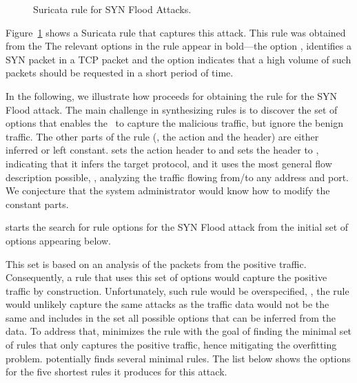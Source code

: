 \documentclass[runningheads]{llncs}
\begin{document}
\begin{figure}[h!]
  
  \caption{Suricata rule for SYN Flood Attacks.}
  \label{fig:synflood-example}
\end{figure}


Figure~\ref{fig:synflood-example} shows a Suricata rule that captures
this attack. This rule was obtained from the 
The relevant options in the rule appear in bold---the option
, identifies a SYN packet in a TCP packet and the
option  indicates that a high volume of such packets should be
requested in a short period of time.




In the following, we illustrate how \tname{} proceeds for obtaining
the rule for the SYN Flood attack. The main challenge in synthesizing
rules is to discover the set of options that enables the \nids\ to
capture the malicious traffic, but ignore the benign traffic.  The
other parts of the rule (\ie{}, the action and the header) are either
inferred or left constant. \tname{} sets the action header to
 and sets the header to , indicating that it infers the target protocol, and it uses the
most general flow description possible, \ie{}, analyzing the traffic
flowing from/to any address and port.  We conjecture that the system
administrator would know how to modify the constant parts.

\tname{} starts the search for rule options for the SYN Flood attack
from the initial set of options appearing below.

\begin{figure}[h!]
  \vspace{-3ex}
  
  \vspace{-3ex}  
\end{figure}

This set is based on an analysis of the packets from the positive
traffic. Consequently, a rule that uses this set of options would
capture the positive traffic by construction. Unfortunately, such rule
would be overspecified, \ie{}, the rule would unlikely capture the
same attacks as the traffic data would not be the same and \tname{}
includes in the set all possible options that can be inferred from the
data. To address that, \tname{} minimizes the rule with the goal of
finding the minimal set of rules that only captures the positive
traffic, hence mitigating the overfitting problem. \tname{}
potentially finds several minimal rules. The list below shows the
options for the five shortest rules it produces for this attack.
\end{document}
